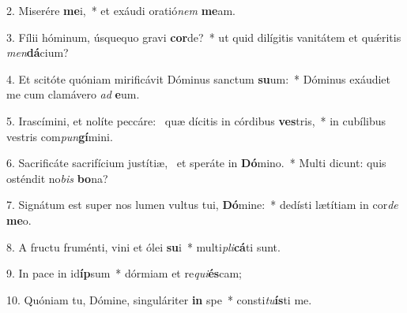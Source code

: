 2. Miserére \textbf{me}i,~*  et exáudi oratió\textit{nem} \textbf{me}am.\

3. Fílii hóminum, úsquequo gravi \textbf{cor}de?~*  ut quid dilígitis vanitátem et quǽritis \textit{men}\textbf{dá}cium?\

4. Et scitóte quóniam mirificávit Dóminus sanctum \textbf{su}um:~*  Dóminus exáudiet me cum clamávero \textit{ad} \textbf{e}um.\

5. Irascímini, et nolíte peccáre: \dag\  quæ dícitis in córdibus \textbf{ves}tris,~*  in cubílibus vestris com\textit{pun}\textbf{gí}mini.\

6. Sacrificáte sacrifícium justítiæ, \dag\  et speráte in \textbf{Dó}mino.~*  Multi dicunt: quis osténdit no\textit{bis} \textbf{bo}na?\

7. Signátum est super nos lumen vultus tui, \textbf{Dó}mine:~*  dedísti lætítiam in cor\textit{de} \textbf{me}o.\

8. A fructu fruménti, vini et ólei \textbf{su}i~*  multi\textit{pli}\textbf{cá}ti sunt.\

9. In pace in id\textbf{íp}sum~*  dórmiam et re\textit{qui}\textbf{és}cam;\

10. Quóniam tu, Dómine, singuláriter \textbf{in} spe~*  consti\textit{tu}\textbf{ís}ti me.\

